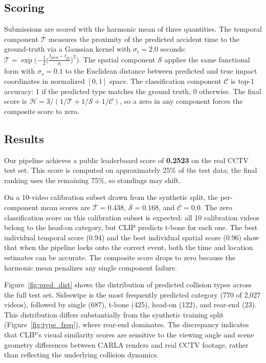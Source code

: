 \documentclass{article}
\begin{document}
\subsection{Scoring}

Submissions are scored with the harmonic mean of three quantities. The temporal component $\mathcal{T}$ measures the proximity of the predicted accident time to the ground-truth via a Gaussian kernel with $\sigma_t = 2.0$ seconds: $\mathcal{T} = \exp\!\big({-\tfrac{1}{2}}\big(\tfrac{t_{\text{pred}} - t_{\text{gt}}}{\sigma_t}\big)^{2}\big)$. The spatial component $\mathcal{S}$ applies the same functional form with $\sigma_s = 0.1$ to the Euclidean distance between predicted and true impact coordinates in normalized $[0,1]$ space. The classification component $\mathcal{C}$ is top-1 accuracy: 1 if the predicted type matches the ground truth, 0 otherwise. The final score is $\mathcal{H} = 3 / (1/\mathcal{T} + 1/\mathcal{S} + 1/\mathcal{C})$, so a zero in any component forces the composite score to zero.

\subsection{Results}

Our pipeline achieves a public leaderboard score of \textbf{0.2523} on the real CCTV test set. This score is computed on approximately 25\% of the test data; the final ranking uses the remaining 75\%, so standings may shift.

On a 10-video calibration subset drawn from the synthetic split, the per-component mean scores are $\overline{\mathcal{T}} = 0.438$, $\overline{\mathcal{S}} = 0.168$, and $\overline{\mathcal{C}} = 0.0$. The zero classification score on this calibration subset is expected: all 10 calibration videos belong to the head-on category, but CLIP predicts t-bone for each one. The best individual temporal score (0.94) and the best individual spatial score (0.96) show that when the pipeline locks onto the correct event, both the time and location estimates can be accurate. The composite score drops to zero because the harmonic mean penalizes any single component failure.

Figure~\ref{fig:pred_dist} shows the distribution of predicted collision types across the full test set. Sideswipe is the most frequently predicted category (770 of 2,027 videos), followed by single (687), t-bone (425), head-on (122), and rear-end (23). This distribution differs substantially from the synthetic training split (Figure~\ref{fig:type_freq}), where rear-end dominates. The discrepancy indicates that CLIP's visual similarity scores are sensitive to the viewing angle and scene geometry differences between CARLA renders and real CCTV footage, rather than reflecting the underlying collision dynamics.
\end{document}
